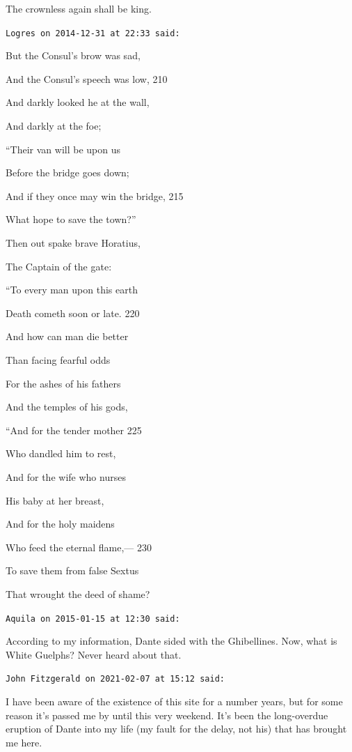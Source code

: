 \begin{footnotesize}
\begin{sffamily}
The crownless again shall be king.

\hfill

\texttt{Logres on 2014-12-31 at 22:33 said:}

But the Consul's brow was sad,

And the Consul's speech was low, 210

And darkly looked he at the wall,

And darkly at the foe;

``Their van will be upon us

Before the bridge goes down;

And if they once may win the bridge, 215

What hope to save the town?''

Then out spake brave Horatius,

The Captain of the gate:

``To every man upon this earth

Death cometh soon or late. 220

And how can man die better

Than facing fearful odds

For the ashes of his fathers

And the temples of his gods,

``And for the tender mother 225

Who dandled him to rest,

And for the wife who nurses

His baby at her breast,

And for the holy maidens

Who feed the eternal flame,--- 230

To save them from false Sextus

That wrought the deed of shame?

\hfill

\texttt{Aquila on 2015-01-15 at 12:30 said:}

According to my information, Dante sided with the Ghibellines. Now, what is White Guelphs? Never heard about that.

\hfill

\texttt{John Fitzgerald on 2021-02-07 at 15:12 said:}

I have been aware of the existence of this site for a number years, but for some reason it's passed me by until this very weekend. It's been the long-overdue eruption of Dante into my life (my fault for the delay, not his) that has brought me here.


\end{sffamily}
\end{footnotesize}
